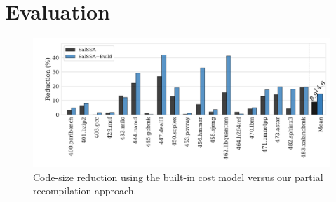 \section{Evaluation}

\begin{figure}[h]
  \centering
  \includegraphics[width=\textwidth]{src/deeplearning/figs/code-size-partial-oracle-v1.pdf}
  \caption{Code-size reduction using the built-in cost model versus our partial recompilation approach.}
  \label{fig:code-size-partial-oracle}
\end{figure}
